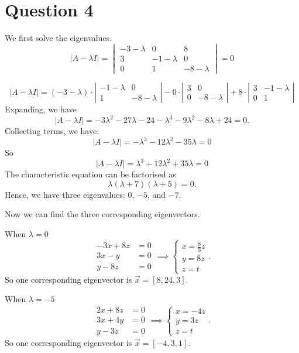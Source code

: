 \documentclass[12pt,a4paper]{article}
\begin{document}
\section*{Question 4}
\begin{solution}
We first solve the eigenvalues.
\[
|A-\lambda I|=
\begin{vmatrix}
-3-\lambda & 0 & 8 \\
3 & -1-\lambda & 0 \\
0 & 1 & -8-\lambda
\end{vmatrix}
=0
\]

\[
|A-\lambda I|=(-3-\lambda) \cdot\left|\begin{array}{cc}
-1-\lambda & 0 \\
1 & -8-\lambda
\end{array}\right|-0 \cdot\left|\begin{array}{cc}
3 & 0 \\
0 & -8-\lambda
\end{array}\right|+8 \cdot\left|\begin{array}{cc}
3 & -1-\lambda \\
0 & 1
\end{array}\right|
\]
Expanding, we have
\[
|A-\lambda I|=-3 \lambda^2-27 \lambda-24-\lambda^3-9 \lambda^2-8 \lambda+24 = 0.
\]
Collecting terms, we have:
\[
|A-\lambda I|=-\lambda^3-12 \lambda^2-35 \lambda = 0
\]
So
\[
|A-\lambda I|= \lambda^3+12 \lambda^2+35 \lambda = 0
\]
The characteristic equation can be factorised as
\[
\lambda (\lambda+7)(\lambda+5) = 0.
\]
Hence, we have three eigenvalues: $0$, $-5$, and $-7$.

Now we can find the three corresponding eigenvectors.

When $\lambda = 0$
\[
\begin{aligned}
-3x + 8z &= 0 \\
3x - y &= 0 \\
y - 8z &= 0
\end{aligned}
\implies
\begin{cases}
    x = \frac{8}{3} z\\
    y = 8 z\\
    z = t
\end{cases}.
\]
So one corresponding eigenvector is $\Vec{x}=\left[8, 24, 3\right]$.

When $\lambda = -5$
\[
\begin{aligned}
2x + 8z &= 0 \\
3x + 4y &= 0 \\
y - 3z &= 0
\end{aligned}
\implies
\begin{cases}
    x = -4 z\\
    y = 3 z\\
    z = t
\end{cases}.
\]
So one corresponding eigenvector is $\Vec{x}=\left[-4, 3, 1\right]$.


\end{solution}
\end{document}
